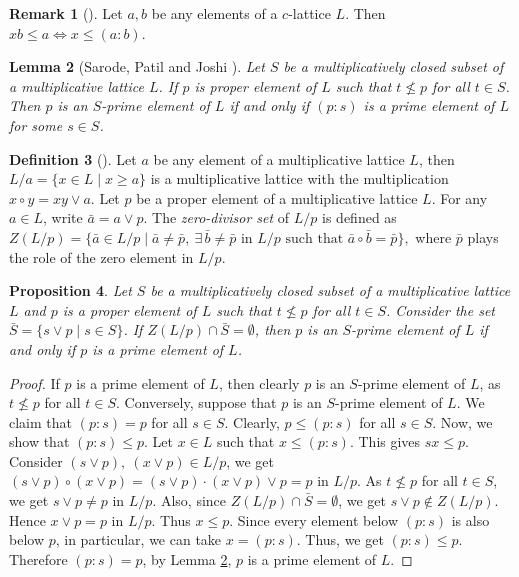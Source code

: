 \documentclass[10pt,twoside,a4paper]{amsart}
\numberwithin{equation}{section}
\theoremstyle{plain}
\newtheorem{lem}{Lemma}[section]
\newtheorem{prop}[lem]{Proposition}
\theoremstyle{definition}
\newtheorem{rem}[lem]{Remark}
\newtheorem{defn}[lem]{Definition}
\begin{document}
		
		
	\begin{rem} [\cite{D, SJ, WD}]
	Let $a,b $ be any elements of a $c$-lattice $L$. Then  $x b \leq a
	\Leftrightarrow x \leq (a:b)$. 
	\end{rem}

	\begin{lem} [Sarode, Patil and Joshi \cite{SPJ1}]\label{L2.1}
	Let $S$ be a multiplicatively closed subset of a multiplicative lattice $L$. If $p$ is proper element of $L$ such that $t \nleq p$ for all $t \in S$. Then $p$ is an $S$-prime element of $L$ if and only if $(p : s)$ is a prime element of $L$ for some $s \in S$. 
	\end{lem}
		
	
	\begin{defn} [\cite{D}]
	Let $a$ be any element of a multiplicative lattice $L$, then $L/a =\{ x \in L \;|\; x \geq a\}$ is  a multiplicative  lattice with the  multiplication $x \circ y = x  y \vee a$.  Let $p$ be a proper element of a multiplicative lattice $L$. 
	For any $a \in L$, write $\bar{a} = a \vee p$. The \textit{zero-divisor set} of $L/p$ is defined as	$Z(L/p) = \{ \bar{a} \in L/p \mid \bar{a} \neq \bar{p},\ 	\exists\, \bar{b} \neq \bar{p} \text{ in } L/p \text{ such that } \bar{a} \circ \bar{b} = \bar{p} \},$		where $\bar{p}$ plays the role of the zero element in $L/p$.
	\end{defn}
		
		
	\begin{prop}\label{L2.5} 
	Let $S$ be a multiplicatively closed subset of a multiplicative lattice $L$ and $p$ is a proper element of $L$ such that $t \nleq p$ for all  $t\in S$. Consider the set $\bar{S} = \{s \vee p \;|\; s \in S \}$. If $Z(L/p) \cap \bar{S} = \emptyset$, then $p$ is an $S$-prime element of $L$ if and only if  $p$ is  a prime element of $L$.
	\end{prop}
		
	
	\begin{proof}
	If $p$ is  a prime element of $L$, then clearly $p$ is  an $S$-prime element of $L$, as $t \nleq p$ for all  $t\in S$. Conversely, suppose that $p$ is an $S$-prime element of $L$.  We claim that $(p:s) = p$ for all $s \in S$. Clearly, $p\leq (p:s)$ for all $s \in S$. Now, we show that $(p:s)\leq p$. Let $x \in L$ such that $x \leq (p:s)$. This gives $sx \leq p$. Consider $(s \vee p), ~ (x \vee p) \in L/p$, we get  $(s \vee p) \circ (x \vee p) =(s \vee p) \cdot (x \vee p) \vee p= p $ in $L/p$. As  $t \nleq p$ for all  $t\in S$, we get $s \vee p \neq p$ in $L/p$. Also, since $Z(L/p) \cap \bar{S} = \emptyset$, we get $s \vee p \not\in Z(L/p) $. Hence $x \vee p = p$ in $L/p$. Thus $x \leq p$. Since every  element below $ (p:s)$ is also below $ p$, in particular, we can take $x=(p:s)$. Thus, we get $(p:s) \leq p$. Therefore $(p:s) =p$, by Lemma \ref{L2.1}, $p$ is  a prime element of $L$. 
	\end{proof}	
		
\end{document}
